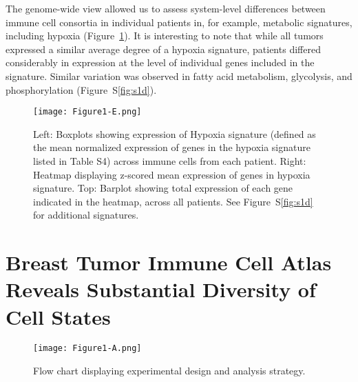 
The genome-wide view allowed us to assess system-level differences between immune cell consortia in individual patients in, for example, metabolic signatures, including hypoxia (Figure~\ref{fig:1e}).
It is interesting to note that while all tumors expressed a similar average degree of a hypoxia signature, patients differed considerably in expression at the level of individual genes included in the signature.
Similar variation was observed in fatty acid metabolism, glycolysis, and phosphorylation (Figure~S\ref{fig:s1d}).

\begin{figure}
\centering
\texttt{[image: Figure1-E.png]}
\caption{Left: Boxplots showing expression of Hypoxia signature (defined as the mean normalized expression of genes in the hypoxia signature listed in Table S4) across immune cells from each patient.
  Right: Heatmap displaying z-scored mean expression of genes in hypoxia signature.
  Top: Barplot showing total expression of each gene indicated in the heatmap, across all patients.
  See Figure~S\ref{fig:s1d} for additional signatures.
}
\label{fig:1e}
\end{figure}

\section{Breast Tumor Immune Cell Atlas Reveals Substantial Diversity of Cell States}

\begin{figure}
\centering
\texttt{[image: Figure1-A.png]}
\caption{Flow chart displaying experimental design and analysis strategy.}
\label{fig:1a}
\end{figure} %

